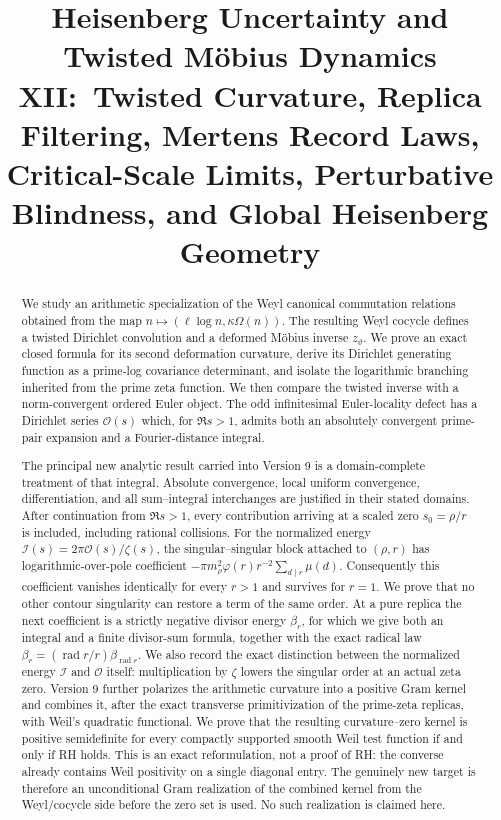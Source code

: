 \documentclass[11pt]{amsart}
\title[Heisenberg Uncertainty and M\"obius Dynamics XII]{
Heisenberg Uncertainty and Twisted M\"obius Dynamics XII:\
Twisted Curvature, Replica Filtering, Mertens Record Laws,\\
Critical-Scale Limits, Perturbative Blindness, and Global Heisenberg Geometry
}
\author{}
\date{}
\numberwithin{equation}{section}
\theoremstyle{plain}
\theoremstyle{definition}
\theoremstyle{remark}
\begin{document}
\begin{abstract}
We study an arithmetic specialization of the Weyl canonical commutation
relations obtained from the map
\(n\mapsto (\ell\log n,\kappa\Omega(n))\).  The resulting Weyl cocycle
defines a twisted Dirichlet convolution and a deformed M\"obius inverse
\(z_\vartheta\).  We prove an exact closed formula for its second deformation
curvature, derive its Dirichlet generating function as a prime-log covariance
determinant, and isolate the logarithmic branching inherited from the prime
zeta function.  We then compare the twisted inverse with a norm-convergent
ordered Euler object.  The odd infinitesimal Euler-locality defect has a
Dirichlet series \(\mathcal O(s)\) which, for \(\Re s>1\), admits both an
absolutely convergent prime-pair expansion and a Fourier-distance integral.

The principal new analytic result carried into Version 9 is a domain-complete treatment
of that integral.  Absolute convergence, local uniform convergence,
differentiation, and all sum--integral interchanges are justified in their
stated domains.  After continuation from \(\Re s>1\), every contribution
arriving at a scaled zero \(s_0=\rho/r\) is included, including rational
collisions.  For the normalized energy
\(\mathcal I(s)=2\pi\mathcal O(s)/\zeta(s)\), the singular--singular block attached to \((\rho,r)\) has
logarithmic-over-pole coefficient
\(-\pi m_\rho^2\varphi(r)r^{-2}\sum_{d\mid r}\mu(d)\).
Consequently this coefficient vanishes identically for every \(r>1\) and
survives for \(r=1\).  We prove that no other contour singularity can restore
a term of the same order.  At a pure replica the next coefficient is a
strictly negative divisor energy \(\beta_r\), for which we give both an
integral and a finite divisor-sum formula, together with the exact radical law
\(\beta_r=(\operatorname{rad}r/r)\beta_{\operatorname{rad}r}\).  We also
record the exact distinction between the normalized energy \(\mathcal I\) and
\(\mathcal O\) itself: multiplication by \(\zeta\) lowers the singular order
at an actual zeta zero.  Version 9 further polarizes the arithmetic curvature
into a positive Gram kernel and combines it, after the exact transverse
primitivization of the prime-zeta replicas, with Weil's quadratic functional.
We prove that the resulting curvature--zero kernel is positive semidefinite
for every compactly supported smooth Weil test function if and only if RH
holds.  This is an exact reformulation, not a proof of RH: the converse already
contains Weil positivity on a single diagonal entry.  The genuinely new target
is therefore an unconditional Gram realization of the combined kernel from
the Weyl/cocycle side before the zero set is used.  No such realization is
claimed here.


\end{abstract}
\end{document}
